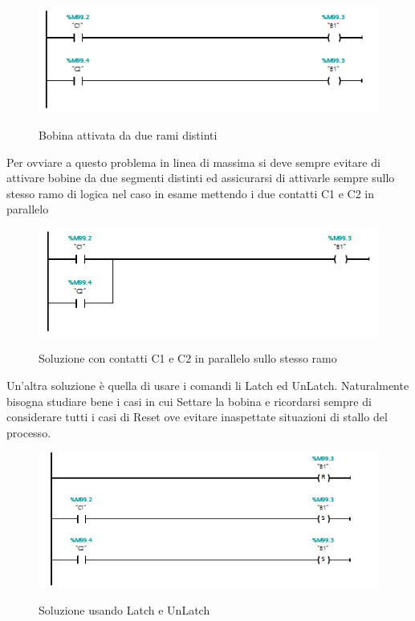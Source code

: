 \documentclass[12pt, a4paper, oneside]{book}
\begin{document}
	\begin{figure}[H]
		\centering
		\includegraphics[width=12cm]{Immagini/LAD1}
		\label{lad1}
		\caption{Bobina attivata da due rami distinti}
	\end{figure}

	Per ovviare a questo problema in linea di massima si deve sempre evitare di attivare bobine da due segmenti distinti ed assicurarsi di attivarle sempre sullo stesso ramo di logica nel caso in esame mettendo i due contatti C1 e C2 in parallelo
	
		\begin{figure}[H]
		\centering
		\includegraphics[width=12cm]{Immagini/LAD2}
		\label{lad2}
		\caption{ Soluzione con contatti C1 e C2 in parallelo sullo stesso ramo}
	\end{figure}
	
	Un'altra soluzione è quella di usare i comandi li Latch ed UnLatch. Naturalmente bisogna studiare bene i casi in cui Settare la bobina e ricordarsi sempre di considerare tutti i casi di Reset ove evitare inaspettate situazioni di stallo del processo. 
	
		\begin{figure}[H]
		\centering
		\includegraphics[width=12cm]{Immagini/LAD3}
		\label{lad3}
		\caption{ Soluzione usando Latch e UnLatch}
	\end{figure}
	
\end{document}
